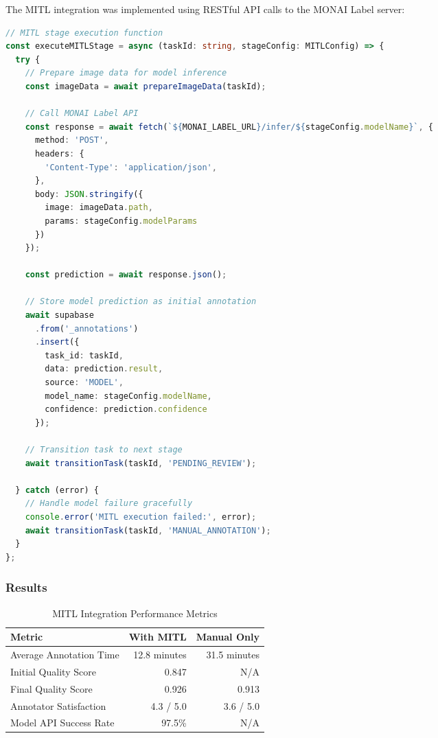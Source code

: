 The MITL integration was implemented using RESTful API calls to the MONAI Label server:

\begin{lstlisting}[language=typescript, caption=MITL Integration Implementation]
// MITL stage execution function
const executeMITLStage = async (taskId: string, stageConfig: MITLConfig) => {
  try {
    // Prepare image data for model inference
    const imageData = await prepareImageData(taskId);
    
    // Call MONAI Label API
    const response = await fetch(`${MONAI_LABEL_URL}/infer/${stageConfig.modelName}`, {
      method: 'POST',
      headers: {
        'Content-Type': 'application/json',
      },
      body: JSON.stringify({
        image: imageData.path,
        params: stageConfig.modelParams
      })
    });
    
    const prediction = await response.json();
    
    // Store model prediction as initial annotation
    await supabase
      .from('_annotations')
      .insert({
        task_id: taskId,
        data: prediction.result,
        source: 'MODEL',
        model_name: stageConfig.modelName,
        confidence: prediction.confidence
      });
    
    // Transition task to next stage
    await transitionTask(taskId, 'PENDING_REVIEW');
    
  } catch (error) {
    // Handle model failure gracefully
    console.error('MITL execution failed:', error);
    await transitionTask(taskId, 'MANUAL_ANNOTATION');
  }
};
\end{lstlisting}

\subsubsection{Results}

\begin{table}[htbp]
\centering
\caption{MITL Integration Performance Metrics}
\label{tab:mitl-results}
\begin{tabular}{|l|r|r|}
\hline
\textbf{Metric} & \textbf{With MITL} & \textbf{Manual Only} \\
\hline
Average Annotation Time & 12.8 minutes & 31.5 minutes \\
Initial Quality Score & 0.847 & N/A \\
Final Quality Score & 0.926 & 0.913 \\
Annotator Satisfaction & 4.3 / 5.0 & 3.6 / 5.0 \\
Model API Success Rate & 97.5\% & N/A \\
\hline
\end{tabular}
\end{table}

